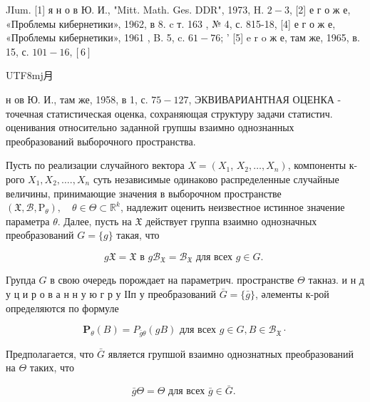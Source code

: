 \documentclass[10pt]{article}
\begin{document}
JIum. [1] я н о в Ю. И., "Mitt. Math. Ges. DDR", 1973, H. $2-3$, [2] е г о ж е, «Проблемы кибернетики», 1962, в 8. c т. 163 , № 4, с. 815-18, [4] е г о ж е, «Проблемы кибернетики», 1961 , B. 5, c. $61-76$; ' [5] e r o ж е, там же, 1965, в. 15, с. $101-16,[6]$ \begin{CJK}{UTF8}{mj}月\end{CJK} н ов Ю. И., там же, 1958, в 1, с. $75-127$, ЭКВИВАРИАНТНАЯ ОЦЕНКА - точечная статистическая оценка, сохраняющая структуру задачи статистич. оценивания относительно заданной групшы взаимно однознанных преобразований выборочного пространства.



Пусть по реализации случайного вектора $X=\left(X_{1}\right.$, $\left.X_{2}, \ldots, X_{n}\right)$, компоненты к-рого $X_{1}, X_{2}, \ldots ., X_{n}$ суть независимые одинаково распределенные случайные величины, принимающие значения в выборочном пространстве $\left(\mathfrak{X}, \mathscr{B}, \mathrm{P}_{\theta}\right), \quad \theta \in \Theta \subset \mathbb{R}^{k}$, надлежит оценить неизвестное истинное значение параметра $\theta$. Далее, пусть на $\mathfrak{X}$ действует группа взаимно однозначных преобразований $G=\{g\}$ такая, что



\[

g \mathfrak{X}=\mathfrak{X} \text { в } g \mathscr{B}_{\mathfrak{X}}=\mathscr{B}_{\mathfrak{X}} \text { для всех } g \in G \text {. }

\]



Групда $G$ в свою очередь порождает на параметрич. пространстве $\Theta$ такназ. и н д у ц и р о в а н н у ю г р у ІІп у преобразований $\bar{G}=\{\bar{g}\}$, әлементы к-рой определяются по формуле



\[

\boldsymbol{P}_{\theta}(B)=P_{\bar{g} \theta}(g B) \text { для всех } g \in G, B \in \mathcal{B}_{\mathfrak{X}} \cdot

\]



Предполагается, что $\bar{G}$ является групшой взаимно однознатных преобразований на $\Theta$ таких, что



\[

\bar{g} \Theta=\Theta \text { для всех } \bar{g} \in \bar{G} \text {. }

\]
\end{document}
